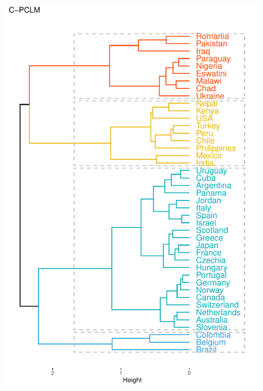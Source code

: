 \documentclass[table,xcdraw,dvipsnames]{beamer}
\begin{document}
\begin{frame}[fragile]
{\begin{columns}
\begin{column}{5cm}
				\includegraphics[scale=.35]{Figures/CombDendo.pdf}
			\end{column}
		\end{columns}
	}
\end{frame}
\end{document}
